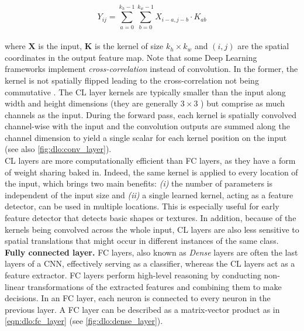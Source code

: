 \begin{equation}
  \label{eqn:dlo:convolution}
    Y_{ij} = \sum_{{a=0}}^{{k_h-1}} \sum_{{b=0}}^{{k_w-1}} X_{i-a, j-b} \cdot K_{ab}    
\end{equation}\\

\noindent where $\mathbf{X}$ is the input, $\mathbf{K}$ is the kernel of size
$k_h \times k_w$ and $(i,j)$ are the spatial coordinates in the output feature
map. Note that some Deep Learning frameworks implement \emph{cross-correlation}
instead of convolution. In the former, the kernel is not spatially flipped
leading to the cross-correlation not being commutative
\cite{goodfellow2016deep}. The \ac{CL} layer kernels are typically smaller than
the input along width and height dimensions (they are generally $3\times 3$
\cite{DBLP:conf/cvpr/HeZRS16}) but comprise as much channels as the input.
During the forward pass, each kernel is spatially convolved channel-wise with
the input and the convolution outputs are summed along the channel dimension to
yield a single scalar for each kernel position on the input (see also
\cref{fig:dlo:conv_layer}).\\

\ac{CL} layers are more computationally efficient than \ac{FC} layers, as they
have a form of weight sharing baked in. Indeed, the same kernel is applied to
every location of the input, which brings two main benefits: \emph{(i)} the
number of parameters is independent of the input size and \emph{(ii)} a single
learned kernel, acting as a feature detector, can be used in multiple locations.
This is especially useful for early feature detector that detects basic shapes
or textures. In addition, because of the kernels being convolved across the
whole input, \ac{CL} layers are also less sensitive to spatial translations that
might occur in different instances of the same class.\\

\noindent \textbf{Fully connected layer.} \ac{FC} layers, also known as
\emph{Dense} layers are often the last layers of a \ac{CNN}, effectively serving
as a classifier, whereas the \ac{CL} layers act as a feature extractor.
\ac{FC} layers perform high-level reasoning by conducting non-linear
transformations of the extracted features and combining them to make decisions.
In an FC layer, each neuron is connected to every neuron in the previous layer.
A \ac{FC} layer can be described as a matrix-vector product as in
\cref{eqn:dlo:fc_layer} (see \cref{fig:dlo:dense_layer}).\\


